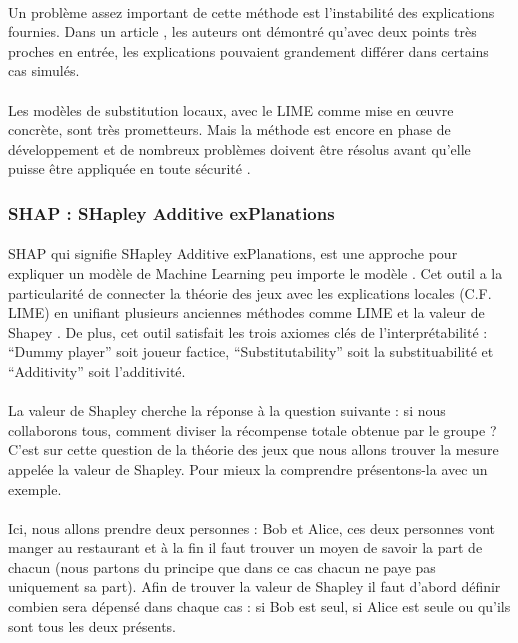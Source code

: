 \documentclass[10pt, french, a4paper]{report}
\begin{document}
\paragraph{}
Un problème assez important de cette méthode est l'instabilité des explications fournies. Dans un article \citep{alvarez_on_the_2018}, les auteurs ont démontré qu'avec deux points très proches en entrée, les explications pouvaient grandement différer dans certains cas simulés. 

\paragraph{}
Les modèles de substitution locaux, avec le LIME comme mise en œuvre concrète, sont très prometteurs. Mais la méthode est encore en phase de développement et de nombreux problèmes doivent être résolus avant qu'elle puisse être appliquée en toute sécurité \citep{molnar2019}.

\subsubsection{SHAP : SHapley Additive exPlanations}
\label{subsec:shap}

\paragraph{}
SHAP qui signifie SHapley Additive exPlanations, est une approche pour expliquer un modèle de Machine Learning peu importe le modèle \citep{NIPS2017_7062}. Cet outil a la particularité de connecter la théorie des jeux avec les explications locales (C.F. LIME) en unifiant plusieurs anciennes méthodes comme LIME et la valeur de Shapey \citep{shapley_17._1953}. De plus, cet outil satisfait les trois axiomes clés de l’interprétabilité : ``Dummy player'' soit joueur factice, ``Substitutability'' soit la substituabilité et ``Additivity'' soit l’additivité.

\paragraph{}
La valeur de Shapley cherche la réponse à la question suivante : si nous collaborons tous, comment diviser la récompense totale obtenue par le groupe ? C’est sur cette question de la théorie des jeux que nous allons trouver la mesure appelée la valeur de Shapley. Pour mieux la comprendre présentons-la avec un exemple.

\paragraph{}
Ici, nous allons prendre deux personnes : Bob et Alice, ces deux personnes vont manger au restaurant et à la fin il faut trouver un moyen de savoir la part de chacun (nous partons du principe que dans ce cas chacun ne paye pas uniquement sa part). Afin de trouver la valeur de Shapley il faut d’abord définir combien sera dépensé dans chaque cas : si Bob est seul, si Alice est seule ou qu’ils sont tous les deux présents. 
\end{document}
